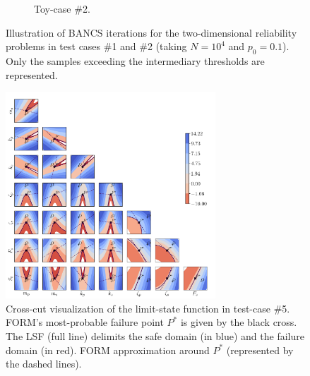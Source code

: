 \begin{figure}
\begin{subfigure}[b]{0.49\linewidth}
        \caption{Toy-case \#2.}
    \end{subfigure}
    \caption{Illustration of BANCS iterations for the two-dimensional reliability problems in test cases \#1 and \#2  (taking $N=10^4$ and $p_0=0.1$). 
    Only the samples exceeding the intermediary thresholds are represented.}
    \label{fig:2D_toycase_reliability}
\end{figure}


\begin{figure}
    \centering
    \includegraphics[width=0.7\textwidth]{part3/figures/BANCS/crosscut_oscillator.png}
    \caption{Cross-cut visualization of the limit-state function in test-case \#5. 
    FORM's most-probable failure point $P^*$ is given by the black cross. 
    The LSF (full line) delimits the safe domain (in blue) and the failure domain (in red). 
    FORM approximation around $P^*$ (represented by the dashed lines).}
    \label{fig:crosscut_oscillator}
\end{figure}



